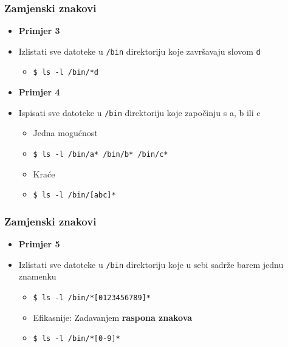 \documentclass{beamer}
\newcommand{\shell}[1]{\texttt{#1}}
\begin{document}
\begin{frame}[t]
\frametitle{Zamjenski znakovi}
\begin{itemize}
	\item \textbf{Primjer 3}
	\item[] Izlistati sve datoteke u \shell{/bin} direktoriju koje završavaju slovom \shell{d}
  \begin{itemize}
    \item[] \shell{\$ ls -l /bin/*d}
  \end{itemize}
\end{itemize}
\vfill
\begin{itemize}
	\item \textbf{Primjer 4}
	\item[] Ispisati sve datoteke u \shell{/bin} direktoriju koje započinju s a, b ili c
  \begin{itemize}
    \item Jedna mogućnost
    \item[] \shell{\$ ls -l /bin/a* /bin/b* /bin/c*}
    \item Kraće
    \item[] \shell{\$ ls -l /bin/[abc]*}
  \end{itemize}
\end{itemize}
\vfill
\end{frame}

\begin{frame}[t]
\frametitle{Zamjenski znakovi}
\begin{itemize}
	\item \textbf{Primjer 5}
	\item[] Izlistati sve datoteke u \shell{/bin} direktoriju koje u sebi 
        sadrže barem jednu znamenku
  \begin{itemize}
    \item[] \shell{\$ ls -l /bin/*[0123456789]*}
    \item Efikasnije: Zadavanjem \textbf{raspona znakova}
    \item[] \shell{\$ ls -l /bin/*[0-9]*}
  \end{itemize}
\end{itemize}
\vfill
\end{frame}
\end{document}
